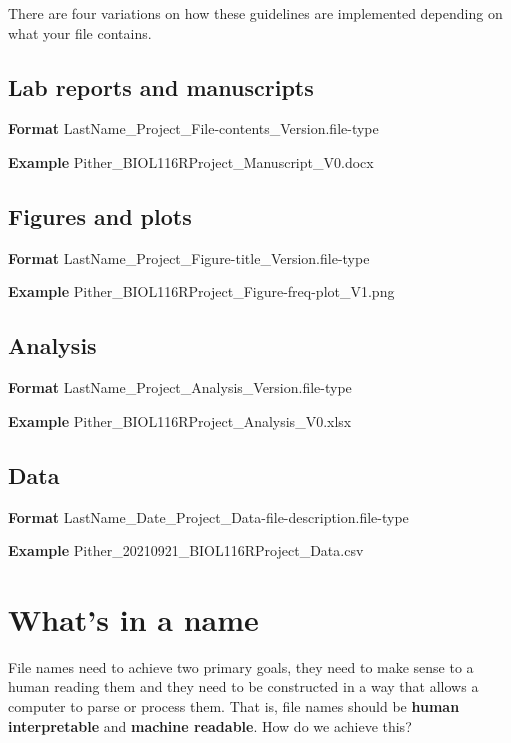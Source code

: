 \documentclass[
]{book}
\begin{document}
There are four variations on how these guidelines are implemented depending on what your file contains.

\hypertarget{lab-reports-and-manuscripts}{%
\subsection{Lab reports and manuscripts}\label{lab-reports-and-manuscripts}}

\textbf{Format} LastName\_Project\_File-contents\_Version.file-type

\textbf{Example} Pither\_BIOL116RProject\_Manuscript\_V0.docx

\hypertarget{figures-and-plots}{%
\subsection{Figures and plots}\label{figures-and-plots}}

\textbf{Format} LastName\_Project\_Figure-title\_Version.file-type

\textbf{Example} Pither\_BIOL116RProject\_Figure-freq-plot\_V1.png

\hypertarget{analysis}{%
\subsection{Analysis}\label{analysis}}

\textbf{Format} LastName\_Project\_Analysis\_Version.file-type

\textbf{Example} Pither\_BIOL116RProject\_Analysis\_V0.xlsx

\hypertarget{data}{%
\subsection{Data}\label{data}}

\textbf{Format} LastName\_Date\_Project\_Data-file-description.file-type

\textbf{Example} Pither\_20210921\_BIOL116RProject\_Data.csv

\hypertarget{whats-in-a-name}{%
\section{What's in a name}\label{whats-in-a-name}}

File names need to achieve two primary goals, they need to make sense to a human reading them and they need to be constructed in a way that allows a computer to parse or process them. That is, file names should be \textbf{human interpretable} and \textbf{machine readable}. How do we achieve this?
\end{document}
